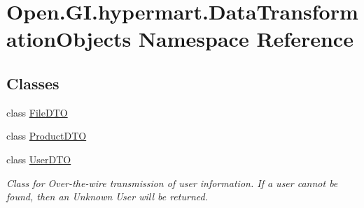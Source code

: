 \hypertarget{namespace_open_1_1_g_i_1_1hypermart_1_1_data_transformation_objects}{}\section{Open.\+G\+I.\+hypermart.\+Data\+Transformation\+Objects Namespace Reference}
\label{namespace_open_1_1_g_i_1_1hypermart_1_1_data_transformation_objects}
\subsection*{Classes}
\begin{DoxyCompactItemize}
\item 
class \hyperlink{class_open_1_1_g_i_1_1hypermart_1_1_data_transformation_objects_1_1_file_d_t_o}{File\+D\+T\+O}
\item 
class \hyperlink{class_open_1_1_g_i_1_1hypermart_1_1_data_transformation_objects_1_1_product_d_t_o}{Product\+D\+T\+O}
\item 
class \hyperlink{class_open_1_1_g_i_1_1hypermart_1_1_data_transformation_objects_1_1_user_d_t_o}{User\+D\+T\+O}
\begin{DoxyCompactList}\small\item\em Class for Over-\/the-\/wire transmission of user information. If a user cannot be found, then an Unknown User will be returned. \end{DoxyCompactList}\end{DoxyCompactItemize}
